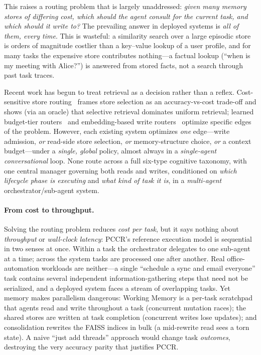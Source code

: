 \documentclass[10pt,twocolumn]{article}
\begin{document}
This raises a routing problem that is largely unaddressed: \emph{given many
memory stores of differing cost, which should the agent consult for the current
task, and which should it write to?} The prevailing answer in deployed systems is
\emph{all of them, every time}. This is wasteful: a similarity search over a
large episodic store is orders of magnitude costlier than a key--value lookup of a
user profile, and for many tasks the expensive store contributes
nothing---a factual lookup (``when is my meeting with Alice?'') is answered from
stored facts, not a search through past task traces.

Recent work has begun to treat retrieval as a decision rather than a reflex.
Cost-sensitive store routing~\cite{pocket} frames store selection as an
accuracy-vs-cost trade-off and shows (via an oracle) that selective retrieval
dominates uniform retrieval; learned budget-tier routers~\cite{budgetmem} and
embedding-based write routers~\cite{memrouter} optimize specific edges of the
problem. However, each existing system optimizes \emph{one} edge---write
admission, \emph{or} read-side store selection, \emph{or} memory-structure choice,
\emph{or} a context budget---under a \emph{single, global} policy, almost always
in a \emph{single-agent conversational} loop. None route across a full six-type
cognitive taxonomy, with one central manager governing both reads and writes,
conditioned on \emph{which lifecycle phase is executing} and \emph{what kind of
task it is}, in a \emph{multi-agent} orchestrator/sub-agent system.

\paragraph{From cost to throughput.} Solving the routing problem reduces
\emph{cost per task}, but it says nothing about \emph{throughput} or
\emph{wall-clock latency}: PCCR's reference execution model is sequential in two
senses at once. Within a task the orchestrator delegates to one sub-agent at a
time; across the system tasks are processed one after another. Real
office-automation workloads are neither---a single ``schedule a sync and email
everyone'' task contains several independent information-gathering steps that need
not be serialized, and a deployed system faces a stream of overlapping tasks. Yet
memory makes parallelism dangerous: Working Memory is a per-task scratchpad that
agents read and write throughout a task (concurrent mutation races); the shared
stores are written at task completion (concurrent writes lose updates); and
consolidation rewrites the FAISS indices in bulk (a mid-rewrite read sees a torn
state). A naive ``just add threads'' approach would change task \emph{outcomes},
destroying the very accuracy parity that justifies PCCR.
\end{document}
